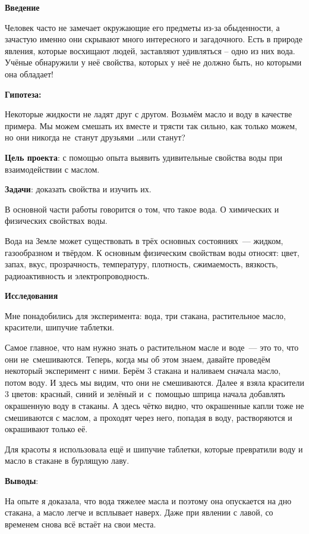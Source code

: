 


\makeProcTitleSchool



\textbf{Введение}

Человек часто не замечает окружающие его предметы из-за обыденности, а зачастую именно они скрывают много интересного и загадочного. Есть в природе явления, которые восхищают людей, заставляют удивляться – одно из них вода. Учёные обнаружили у неё свойства, которых у неё не должно быть, но которыми она обладает!

\textbf{Гипотеза:}

Некоторые жидкости не ладят друг с другом. Возьмём масло и воду в качестве примера. Мы можем смешать их вместе и трясти так сильно, как только можем, но они никогда не~станут друзьями \dots или станут?

\textbf{Цель проекта}: с помощью опыта выявить удивительные свойства воды при взаимодействии с маслом.

\textbf{Задачи}: доказать свойства и изучить их.

В основной части работы говорится о том, что такое вода. О химических и физических свойствах воды.

Вода на Земле может существовать в трёх основных состояниях~--- жидком, газообразном и твёрдом. К основным физическим свойствам воды относят: цвет, запах, вкус, прозрачность, температуру, плотность, сжимаемость, вязкость, радиоактивность и элект\-ропроводность.

\textbf{Исследования}

Мне понадобились для эксперимента: вода, три стакана, растительное масло, красители, шипучие таблетки.\enlargethispage{\baselineskip}

Самое главное, что нам нужно знать о растительном масле и воде~--- это то, что они не~смешиваются. Теперь, когда мы об этом знаем, давайте проведём некоторый эксперимент с ними. Берём 3 стакана и наливаем сначала масло, потом воду.	И здесь мы видим, что они не смешиваются. Далее я взяла красители 3 цветов: красный, синий и зелёный и~с~помощью шприца начала добавлять окрашенную воду в стаканы. А здесь чётко видно, что окрашенные капли тоже не смешиваются с маслом, а проходят через него,  попадая в воду, растворяются и окрашивают только её.\enlargethispage{\baselineskip}

Для красоты я использовала ещё и шипучие таблетки, которые превратили воду и масло в стакане в бурлящую лаву.

\textbf{Выводы}:

На опыте я доказала, что вода тяжелее масла и поэтому она опускается на дно стакана, а масло легче и всплывает наверх. Даже при явлении с лавой, со временем  снова всё встаёт на свои места.
